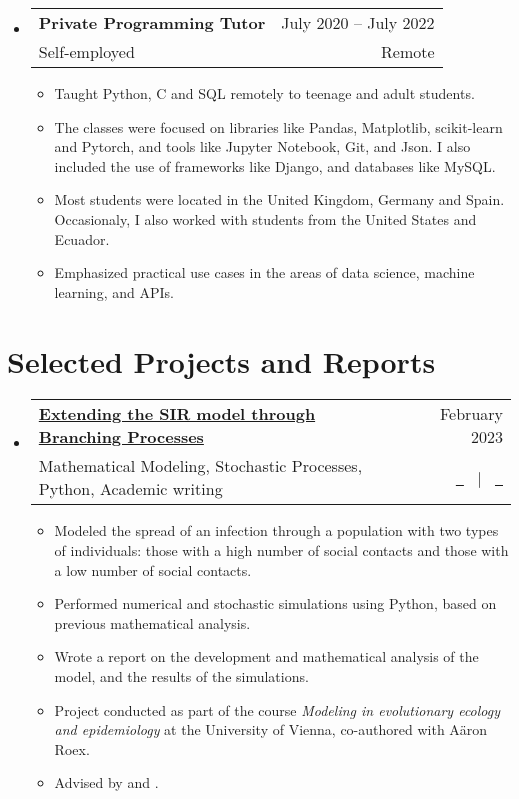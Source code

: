 \documentclass[a4paper,11pt]{article}
\makeatletter
\newcommand{\resumeQuadHeading}[4]{
  \item
  \begin{tabular*}{0.96\textwidth}[t]{l@{\extracolsep{\fill}}r}
    \textbf{#1} & \small #2 \\
    \small#3 & \small #4 \\
  \end{tabular*}
}
\newcommand{\resumeHeadingListStart}{
  \begin{itemize}[leftmargin=0.15in, label={}]
}
\newcommand{\resumeHeadingListEnd}{\end{itemize}}
\makeatother
\begin{document}
  \newpage %
  
  \resumeHeadingListStart{}
    \resumeQuadHeading{Private Programming Tutor}{July 2020 – July 2022}
    {Self-employed}{Remote}
    \begin{itemize}[leftmargin=3em, itemsep=0.1em, topsep=2pt]
      \item \small Taught Python, C and SQL remotely to teenage and adult students.
      \item \small The classes were focused on libraries like Pandas, Matplotlib, scikit-learn and Pytorch, and tools like Jupyter Notebook, Git, and Json. I also included the use of frameworks like Django, and databases like MySQL.
      \item \small Most students were located in the United Kingdom, Germany and Spain. Occasionaly, I also worked with students from the United States and Ecuador.
      \item \small Emphasized practical use cases in the areas of data science, machine learning, and APIs.
    \end{itemize}
  \resumeHeadingListEnd{}



\section{Selected Projects and Reports}
  \resumeHeadingListStart{}
  \resumeQuadHeading{\href{https://github.com/loredanasandu/sir-branching-processes}{Extending the SIR model through Branching Processes}}{February 2023}{\small Mathematical Modeling, Stochastic Processes, Python, Academic writing}{\href{https://github.com/loredanasandu/sir-branching-processes/blob/main/Report_Extending-the-SIR-model-through-BP.pdf}{\faFileTextO \ \graydotuline{Report}} \ $|$ \ \href{https://github.com/loredanasandu/sir-branching-processes/blob/main/Code_Extending-the-SIR-model-through-BP.ipynb}{\faGithub \ \graydotuline{Code}}}
  \begin{itemize}[leftmargin=3em, itemsep=0.1em, topsep=2pt]
    \item \small Modeled the spread of an infection through a population with two types of individuals: those with a high number of social contacts and those with a low number of social contacts.
    \item \small Performed numerical and stochastic simulations using Python, based on previous mathematical analysis.
    \item \small Wrote a report on the development and mathematical analysis of the model, and the results of the simulations.
    \item \small Project conducted as part of the course \textit{Modeling in evolutionary ecology and epidemiology} at the University of Vienna, co-authored with Aäron Roex.
    \item \small Advised by \href{https://ufind.univie.ac.at/en/person.html?id=110430}{} and \href{https://mabshtml.univie.ac.at/polechova/}{}.
  \end{itemize}
  \resumeHeadingListEnd{}
\end{document}
